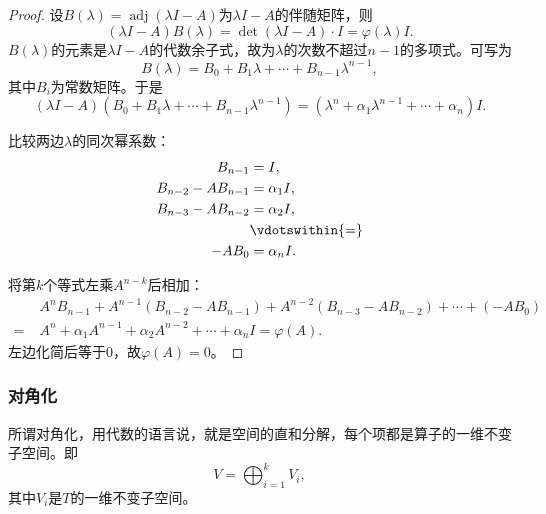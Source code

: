 \begin{proof}
    设$B(\lambda) = \operatorname{adj}(\lambda I - A)$为$\lambda I - A$的伴随矩阵，则
    \begin{equation}
        (\lambda I - A)B(\lambda) = \det(\lambda I - A) \cdot I = \varphi(\lambda)I.
    \end{equation}
    $B(\lambda)$的元素是$\lambda I - A$的代数余子式，故为$\lambda$的次数不超过$n-1$的多项式。可写为
    \begin{equation}
        B(\lambda) = B_0 + B_1\lambda + \cdots + B_{n-1}\lambda^{n-1},
    \end{equation}
    其中$B_i$为常数矩阵。于是
    \begin{equation}
        (\lambda I - A)(B_0 + B_1\lambda + \cdots + B_{n-1}\lambda^{n-1}) = (\lambda^n + \alpha_1\lambda^{n-1} + \cdots + \alpha_n)I.
    \end{equation}

    比较两边$\lambda$的同次幂系数：
    \begin{equation}
        \begin{aligned}
            B_{n-1} &= I, \\
            B_{n-2} - AB_{n-1} &= \alpha_1 I, \\
            B_{n-3} - AB_{n-2} &= \alpha_2 I, \\
            &\vdotswithin{=} \\
            -AB_0 &= \alpha_n I.
        \end{aligned}
    \end{equation}

    将第$k$个等式左乘$A^{n-k}$后相加：
    \begin{align}
        & A^n B_{n-1} + A^{n-1}(B_{n-2} - AB_{n-1}) + A^{n-2}(B_{n-3} - AB_{n-2}) + \cdots + (-AB_0)\nonumber \\
        =\;& A^n + \alpha_1 A^{n-1} + \alpha_2 A^{n-2} + \cdots + \alpha_n I = \varphi(A).
    \end{align}
    左边化简后等于$0$，故$\varphi(A) = 0$。
\end{proof}

\subsubsection{对角化}

所谓对角化，用代数的语言说，就是空间的直和分解，每个项都是算子的一维不变子空间。即
\begin{equation}
    V = \bigoplus_{i=1}^{k} V_i,
\end{equation}
其中$V_i$是$T$的一维不变子空间。


